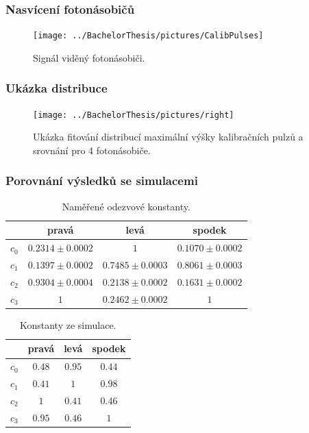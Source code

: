 \documentclass{beamer}
\begin{document}
\begin{frame}
\frametitle{Nasvícení fotonásobičů}
 \begin{figure}[H]
 \centering
 \texttt{[image: ../BachelorThesis/pictures/CalibPulses]}
 \caption{Signál viděný fotonásobiči.}
 \label{UVsource}
\end{figure}


\end{frame}  
 
\begin{frame}
\frametitle{Ukázka distribuce}
 \begin{figure}[H]
 \centering
 \texttt{[image: ../BachelorThesis/pictures/right]}
 \caption{Ukázka fitování distribucí maximální výšky kalibračních pulzů a srovnání pro 4 fotonásobiče.}
 \label{UVsource}
\end{figure}


\end{frame} 


\begin{frame}
\frametitle{Porovnání výsledků se simulacemi}

\begin{table}[H]
\centering
\begin{tabular}{|c|c|c|c|}
\hline
   & pravá & levá & spodek \\ \hline
$c_0$ & $0.2314 \pm 0.0002$    & $1$   				   & $0.1070 \pm 0.0002$     \\ \hline
$c_1$ & $0.1397 \pm 0.0002$    & $0.7485 \pm 0.0003$   & $0.8061 \pm 0.0003$      \\ \hline
$c_2$ & $0.9304 \pm 0.0004$    & $0.2138 \pm 0.0002$   & $0.1631 \pm 0.0002$      \\ \hline
$c_3$ & $1$    				   & $0.2462 \pm 0.0002$   & $1$      \\ \hline
\end{tabular}
\caption{Naměřené odezvové konstanty.}
 \label{CalibConstTbl}
\end{table}






\begin{table}[H]

\begin{tabular}{|c|c|c|c|}
\hline
   & pravá & levá & spodek \\ \hline
$c_0$ & $0.48$    & $0.95$   & $0.44$     \\ \hline
$c_1$ & $0.41$    & $1$   	 & $0.98$      \\ \hline
$c_2$ & $1$    	  & $0.41$   & $0.46$      \\ \hline
$c_3$ & $0.95$    & $0.46$   & $1$      \\ \hline
\end{tabular}
\caption{Konstanty ze simulace.}
 \label{CalibConstTblSim}
\end{table}


\end{frame}
\end{document}
